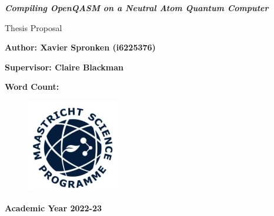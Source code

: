 \documentclass[12pt]{article}
\begin{document}
\begin{titlepage}
    \begin{center}
        \textbf{}
        \vspace{3cm}
        
        \LARGE
        \textbf{\textit{Compiling OpenQASM on a Neutral Atom Quantum Computer}}
        
        \vspace{1cm}
        Thesis Proposal
        
        \vspace{0.7cm}
        \textbf{Author: Xavier Spronken (i6225376)}
        
        \vspace{0.5cm}
        \normalsize
        
        \vspace{1cm}
        \large
        \textbf{Supervisor: Claire Blackman}
        
        \vspace{1cm}
        \textbf{Word Count: }
        
        \vfill
        
        \begin{figure}[H]
            \centering
            \includegraphics{Images/msp-logo.jpeg}
            \label{fig:msp-logo}
        \end{figure}
        
        \vspace{0.5cm}
        \textbf{Academic Year 2022-23}
        
    \end{center}
\end{titlepage}

\tableofcontents

\newpage






\end{document}
